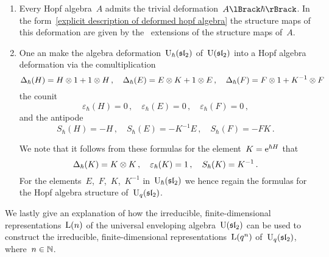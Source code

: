 \documentclass[a4paper, 11pt, oneside]{scrartcl}
\begin{document}
\begin{example}
  \leavevmode
  \begin{enumerate}
    \item
      Every Hopf algebra~$A$ admits the trivial deformation~$\power{A}{\hbar}$.
      In the form~\eqref{explicit description of deformed hopf algebra} the structure maps of this deformation are given by the~\linear{$\kfhbar$} extensions of the structure maps of~$A$.
    \item
      One an make the algebra deformation~$\operatorname{U}_{\hbar}(\mathfrak{sl}_2)$ of~$\operatorname{U}(\mathfrak{sl}_2)$ into a Hopf algebra deformation via the comultiplication
      \[
        \Delta_{\hbar}(H) = H \otimes 1 + 1 \otimes H \,,
        \quad
        \Delta_{\hbar}(E) = E \otimes K + 1 \otimes E \,,
        \quad
        \Delta_{\hbar}(F) = F \otimes 1 + K^{-1} \otimes F \,
      \]
      the counit
      \[
        \varepsilon_{\hbar}(H) = 0 \,,
        \quad
        \varepsilon_{\hbar}(E) = 0 \,,
        \quad
        \varepsilon_{\hbar}(F) = 0 \,,
      \]
      and the antipode
      \[
        S_{\hbar}(H) = - H \,,
        \quad
        S_{\hbar}(E) = - K^{-1} E \,,
        \quad
        S_{\hbar}(F) = - F K \,.
      \]

      We note that it follows from these formulas for the element~$K = \mathrm{e}^{\hbar H}$ that
      \[
        \Delta_{\hbar}(K) = K \otimes K \,,
        \quad
        \varepsilon_{\hbar}(K) = 1 \,,
        \quad
        S_{\hbar}(K) = K^{-1} \,.
      \]
      For the elements~$E$,~$F$,~$K$,~$K^{-1}$ in~$\operatorname{U}_{\hbar}(\mathfrak{sl}_2)$ we hence regain the formulas for the Hopf algebra structure of~$\operatorname{U}_q(\mathfrak{sl}_2)$.
  \end{enumerate}
\end{example}

We lastly give an explanation of how the irreducible, finite-dimensional representations~$\operatorname{L}(n)$ of the universal enveloping algebra~$\operatorname{U}(\mathfrak{sl}_2)$ can be used to construct the irreducible, finite-dimensional representations~$\operatorname{L}(q^n)$ of~$\operatorname{U}_q(\mathfrak{sl}_2)$, where~$n \in \mathbb{N}$.
\end{document}
